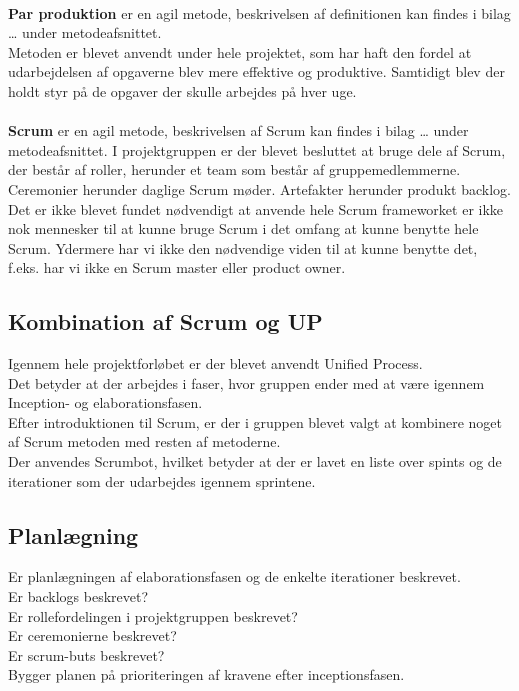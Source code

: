 \\
\textbf{Par produktion} er en agil metode, beskrivelsen af definitionen kan findes i bilag … under metodeafsnittet. \\
Metoden er blevet anvendt under hele projektet, som har haft den fordel at udarbejdelsen af opgaverne blev mere effektive og produktive. Samtidigt blev der holdt styr på de opgaver der skulle arbejdes på hver uge. 
\\ \\
\textbf{Scrum} er en agil metode, beskrivelsen af Scrum kan findes i bilag … under metodeafsnittet.
I projektgruppen er der blevet besluttet at bruge dele af Scrum, der består af roller, herunder et team som består af gruppemedlemmerne. Ceremonier herunder daglige Scrum møder. Artefakter herunder produkt backlog. Det er ikke blevet fundet nødvendigt at anvende hele Scrum frameworket er ikke nok mennesker til at kunne bruge Scrum i det omfang at kunne benytte hele Scrum. Ydermere har vi ikke den nødvendige viden til at kunne benytte det, f.eks. har vi ikke en Scrum master eller product owner. \\

\subsection{Kombination af Scrum og UP}
Igennem hele projektforløbet er der blevet anvendt Unified Process. \\
Det betyder at der arbejdes i faser, hvor gruppen ender med at være igennem Inception- og elaborationsfasen. \\
Efter introduktionen til Scrum, er der i gruppen blevet valgt at kombinere noget af Scrum metoden med resten af metoderne. \\
Der anvendes Scrumbot, hvilket betyder at der er lavet en liste over spints og de iterationer som der udarbejdes igennem sprintene.\\
\subsection{Planlægning}
Er planlægningen af elaborationsfasen og de enkelte iterationer beskrevet.\\
Er backlogs beskrevet?\\
Er rollefordelingen i projektgruppen beskrevet?\\
Er ceremonierne beskrevet?\\
Er scrum-buts beskrevet?\\
Bygger planen på prioriteringen af kravene efter inceptionsfasen.\\